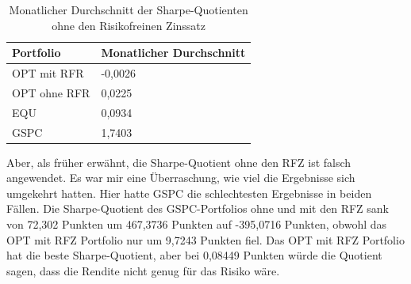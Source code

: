 \documentclass[12pt]{article}
\begin{document}
        \begin{table}[htp]
            \begin{center}
                
                \begin{tabular}{ | l | l | }

                    \hline
                    \textbf{Portfolio}   & \textbf{Monatlicher Durchschnitt} \\
                    \hline
                    OPT mit RFR          & -0,0026 \\      
                    OPT ohne RFR         & 0,0225 \\
                    EQU                  & 0,0934 \\            
                    GSPC                 & 1,7403 \\     
                            
                    \hline

                \end{tabular}
                \caption{Monatlicher Durchschnitt der Sharpe-Quotienten ohne den Risikofreinen Zinssatz}
                \label{md-sq-ohne-rfz}

            \end{center}
        \end{table}

        Aber, als früher erwähnt, die Sharpe-Quotient ohne den RFZ ist falsch angewendet. 
        Es war mir eine Überraschung, wie viel die Ergebnisse sich umgekehrt hatten. 
        Hier hatte GSPC die schlechtesten Ergebnisse in beiden Fällen. 
        Die Sharpe-Quotient des GSPC-Portfolios ohne und mit den RFZ sank von 72,302 Punkten um 467,3736 Punkten auf -395,0716 Punkten, 
        obwohl das OPT mit RFZ Portfolio nur um 9,7243 Punkten fiel. Das OPT mit RFZ Portfolio hat die beste Sharpe-Quotient, 
        aber bei 0,08449 Punkten würde die Quotient sagen, dass die Rendite nicht genug für das Risiko wäre.
\end{document}
